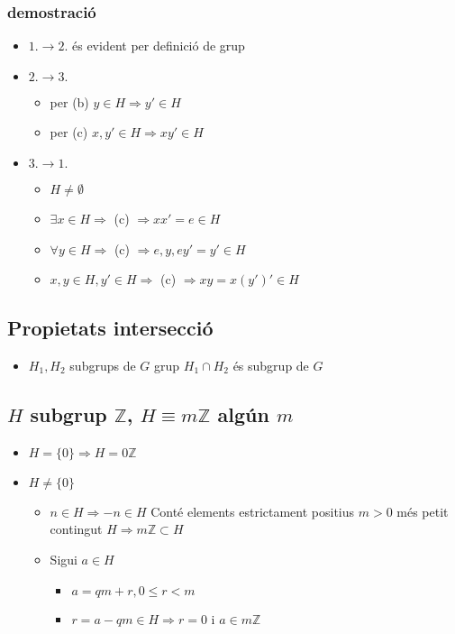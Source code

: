 \documentclass{article}
\newcommand{\Z}{\mathbb{Z}}
\begin{document}
\subsubsection{demostració}
\begin{itemize}
\item $1. \to 2.$ és evident per definició de grup
\item $2. \to 3.$
	\begin{itemize}
	\item per (b) $y \in H \Rightarrow y' \in H$
	\item per (c) $x, y' \in H \Rightarrow xy' \in H$
	\end{itemize}
\item $3. \to 1.$
	\begin{itemize}
	\item $H \neq \emptyset$
	\item $\exists x \in H \Rightarrow$ (c) $\Rightarrow xx' = e \in H$
	\item $\forall y \in H \Rightarrow$ (c) $\Rightarrow e, y, ey' = y' \in H$
	\item $x, y \in H, y' \in H \Rightarrow$ (c) $\Rightarrow xy = x(y')' \in H$
	\end{itemize}
\end{itemize}
\subsection{Propietats intersecció}
\begin{itemize}
\item $H_1, H_2$ subgrups de $G$ grup
	\subitem $H_1 \cap H_2$ és subgrup de $G$
\end{itemize}
\subsection{$H$ subgrup $\Z$, $H \equiv m\Z$ algún $m$}
\begin{itemize}
\item $H = \{0\} \Rightarrow H = 0 \Z$
\item $H \neq \{0\}$
	\begin{itemize}
	\item $n \in H \Rightarrow -n \in H$
		\subitem Conté elements estrictament positius
		\subitem $m > 0$ més petit contingut $H \Rightarrow m\Z \subset H$
	\item Sigui $a \in H$
		\begin{itemize}
		\item $a = qm + r, 0 \le r < m$
		\item $r = a - qm \in H \Rightarrow r = 0$ i $a \in m\Z$
		\end{itemize}
	\end{itemize}
\end{itemize}
\end{document}
